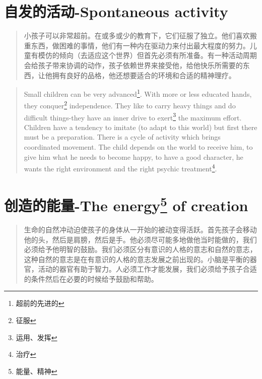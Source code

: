 \documentclass[lang=cn,10pt]{elegantbook}
\begin{document}
\chapter{自发的活动-Spontaneous activity}

\begin{quote}
{\small 小孩子可以非常超前。在或多或少的教育下，它们征服了独立。他们喜欢搬重东西，做困难的事情，他们有一种内在驱动力来付出最大程度的努力。儿童有模仿的倾向（去适应这个世界）但首先必须有所准备。有一种活动周期会给孩子带来协调的动作，孩子依赖世界来接受他，给他快乐所需要的东西，让他拥有良好的品格，他还想要适合的环境和合适的精神理疗。}
\end{quote}

\begin{tcolorbox}
\begin{quote}
{\small Small children can be very advanced\footnote{超前的先进的}. With more or less educated hands, they conquer\footnote{征服} independence. They like to carry heavy things and do difficult things-they have an inner drive to exert\footnote{运用、发挥} the maximum effort. Children have a tendency to imitate (to adapt to this world) but first there must be a preparation. There is a cycle of activity which brings coordinated movement. The child depends on the world to receive him, to give him what he needs to become happy, to have a good character, he wants the right environment and the right psychic treatment\footnote{治疗}.}
\end{quote}
\end{tcolorbox}


\chapter{创造的能量-The energy\footnote{能量、精神} of creation}

\begin{quote}
{\small 生命的自然冲动迫使孩子的身体从一开始的被动变得活跃。首先孩子会移动他的头，然后是肩膀，然后是手。他必须尽可能多地做他当时能做的，我们必须给予他明智的鼓励。我们必须区分有意识的人格的意志和自然的意志，这种自然的意志是在有意识的人格的意志发展之前出现的。小脑是平衡的器官，活动的器官有助于智力。人必须工作才能发展，我们必须给予孩子合适的条件然后在必要的时候给予鼓励和帮助。}
\end{quote}
\end{document}

